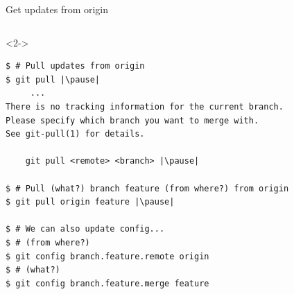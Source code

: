 \begin{frame}[fragile]{Get updates from origin}
\begin{columns}
	\begin{column}{0.6\textwidth}
	\begin{onlyenv}<2->
	\begin{lstlisting}
$ # Pull updates from origin
$ git pull |\pause|
     ...
There is no tracking information for the current branch.
Please specify which branch you want to merge with.
See git-pull(1) for details.

    git pull <remote> <branch> |\pause|
    
$ # Pull (what?) branch feature (from where?) from origin
$ git pull origin feature |\pause|

$ # We can also update config...
$ # (from where?)
$ git config branch.feature.remote origin
$ # (what?)
$ git config branch.feature.merge feature


\end{lstlisting}
\end{onlyenv}
\end{column}
\end{columns}
\end{frame}
